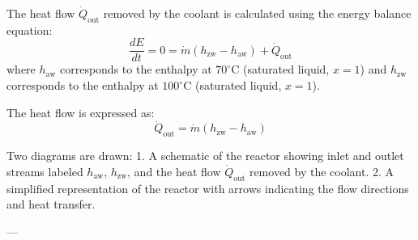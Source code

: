 The heat flow \( \dot{Q}_{\text{out}} \) removed by the coolant is calculated using the energy balance equation:  
\[
\frac{dE}{dt} = 0 = \dot{m} (h_{\text{zw}} - h_{\text{aw}}) + \dot{Q}_{\text{out}}
\]  
where \( h_{\text{aw}} \) corresponds to the enthalpy at \( 70^\circ\text{C} \) (saturated liquid, \( x = 1 \)) and \( h_{\text{zw}} \) corresponds to the enthalpy at \( 100^\circ\text{C} \) (saturated liquid, \( x = 1 \)).  

The heat flow is expressed as:  
\[
\dot{Q}_{\text{out}} = \dot{m} (h_{\text{zw}} - h_{\text{aw}})
\]  

Two diagrams are drawn:  
1. A schematic of the reactor showing inlet and outlet streams labeled \( h_{\text{aw}} \), \( h_{\text{zw}} \), and the heat flow \( \dot{Q}_{\text{out}} \) removed by the coolant.  
2. A simplified representation of the reactor with arrows indicating the flow directions and heat transfer.  

---
